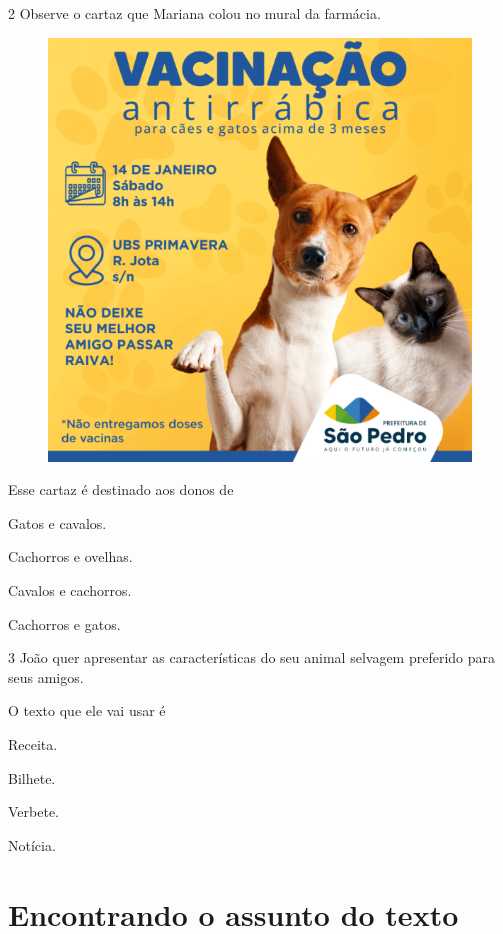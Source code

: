 \pagebreak
\num{2} Observe o cartaz que Mariana colou no mural da farmácia.

\begin{figure}[htpb!]
\centering
\includegraphics[width=.6\textwidth]{media/image115.png}
\end{figure}

Esse cartaz é destinado aos donos de 

\begin{escolha}
	\item Gatos e cavalos.

	\item Cachorros e ovelhas.

	\item Cavalos e cachorros.

	\item Cachorros e gatos.
\end{escolha}

\num{3} João quer apresentar as características do seu animal selvagem
preferido para seus amigos.

O texto que ele vai usar é

\begin{escolha}
	\item Receita.

	\item Bilhete.

	\item Verbete.

	\item Notícia.
\end{escolha}

\chapter{Encontrando o assunto do texto}

